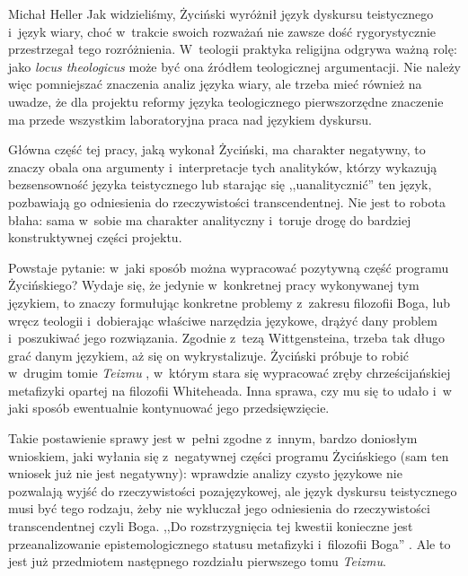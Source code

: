 \begin{artplenv}{Michał Heller}
Jak widzieliśmy, Życiński wyróżnił język dyskursu teistycznego i~język wiary, choć w~trakcie swoich rozważań nie zawsze dość rygorystycznie przestrzegał tego rozróżnienia. W~teologii praktyka religijna odgrywa ważną rolę: jako \textit{locus theologicus} może być ona źródłem teologicznej argumentacji. Nie należy więc pomniejszać znaczenia analiz języka wiary, ale trzeba mieć również na uwadze, że dla projektu reformy języka teologicznego pierwszorzędne znaczenie ma przede wszystkim laboratoryjna praca nad językiem dyskursu.

Główna część tej pracy, jaką wykonał Życiński, ma charakter negatywny, to znaczy obala ona argumenty i~interpretacje tych analityków, którzy wykazują bezsensowność języka teistycznego lub starając się ,,uanalitycznić'' ten język, pozbawiają go odniesienia do rzeczywistości transcendentnej. Nie jest to robota błaha: sama w~sobie ma charakter analityczny i~toruje drogę do bardziej konstruktywnej części projektu.

Powstaje pytanie: w~jaki sposób można wypracować pozytywną część programu Życińskiego? Wydaje się, że jedynie w~konkretnej pracy wykonywanej tym językiem, to znaczy formułując konkretne problemy z~zakresu filozofii Boga, lub wręcz teologii i~dobierając właściwe narzędzia językowe, drążyć dany problem i~poszukiwać jego rozwiązania. Zgodnie z~tezą Wittgensteina, trzeba tak długo grać danym językiem, aż się on wykrystalizuje. Życiński próbuje to robić w~drugim tomie \textit{Teizmu}
\parencite[][]{zycinski_teizm_1988}, %
 w~którym stara się wypracować zręby chrześcijańskiej metafizyki opartej na filozofii Whiteheada. Inna sprawa, czy mu się to udało i~w jaki sposób ewentualnie kontynuować jego przedsięwzięcie.

Takie postawienie sprawy jest w~pełni zgodne z~innym, bardzo doniosłym wnioskiem, jaki wyłania się z~negatywnej części programu Życińskiego (sam ten wniosek już nie jest negatywny): wprawdzie analizy czysto językowe nie pozwalają wyjść do rzeczywistości pozajęzykowej, ale język dyskursu teistycznego musi być tego rodzaju, żeby nie wykluczał jego odniesienia do rzeczywistości transcendentnej czyli Boga. ,,Do rozstrzygnięcia tej kwestii konieczne jest przeanalizowanie epistemologicznego statusu metafizyki i~filozofii Boga''
\parencite[][s.~36]{zycinski_teizm_1985}. %
 Ale to jest już przedmiotem następnego rozdziału pierwszego tomu \textit{Teizmu}.


\end{artplenv}
